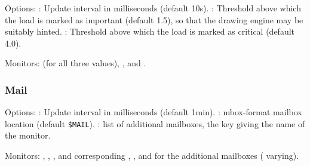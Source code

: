 Options: : Update interval in milliseconds
(default 10s). : Threshold above which 
the load is marked as important (default 1.5), so that the 
drawing engine may be suitably hinted. : 
Threshold above which  the load is marked as critical (default 4.0).


Monitors:  (for all three values), 
,  and .


\subsubsection{Mail}

Options: : Update interval in milliseconds
(default 1min). : mbox-format mailbox location
(default \verb!$MAIL!). 
: list of additional mailboxes, the key giving the 
name of the monitor.

Monitors: , ,
, and corresponding
, , and 
for the additional mailboxes (\codestr{*} varying).
